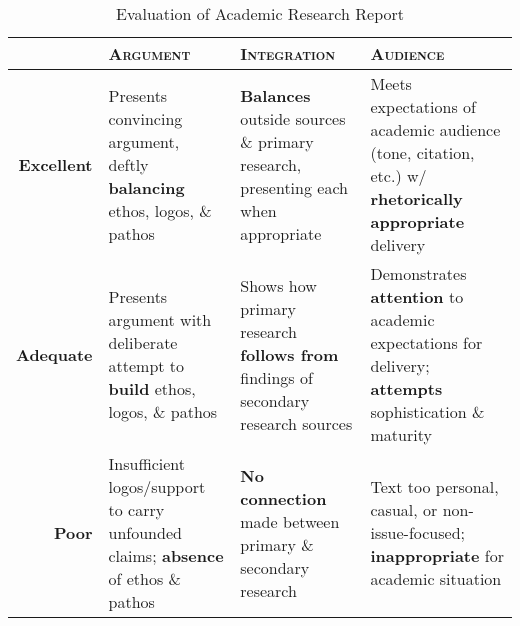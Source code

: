 \documentclass[10pt,oneside]{amsart}	%
\begin{document}
\begin{table}[b]
	\caption{Evaluation of Academic Research Report}\label{tab:rubric}
\begin{tabulary}{\textwidth}{rLLL}
	\toprule  & \textbf{\textsc{Argument}} 
	& \textbf{\textsc{Integration}}
	& \textbf{\textsc{Audience}} \\
\midrule	\textbf{Excellent} 
& Presents convincing argument, deftly \textbf{balancing} ethos, logos, \& pathos
& \textbf{Balances} outside sources \& primary research, presenting each when appropriate
& Meets expectations of academic audience (tone, citation, etc.) w/ \textbf{rhetorically appropriate} delivery  \\
\midrule	\textbf{Adequate} 
& Presents argument with deliberate attempt to \textbf{build} ethos, logos, \& pathos 
& Shows how primary research \textbf{follows from} findings of secondary research sources
& Demonstrates \textbf{attention} to academic expectations for delivery; \textbf{attempts} sophistication \& maturity \\
\midrule	\textbf{Poor} 
& Insufficient logos/support to carry unfounded claims; \textbf{absence} of ethos \& pathos
& \textbf{No connection} made between primary \& secondary research
& Text too personal, casual, or non-issue-focused; \textbf{inappropriate} for academic situation \\
	\bottomrule
\end{tabulary}
\end{table}
\end{document}
